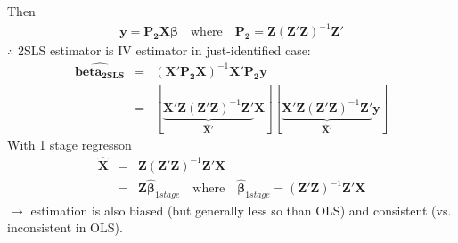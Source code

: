 Then
\begin{eqnarray*}
\boldsymbol{y}=\boldsymbol{P_{2}X\beta}\quad\text{where}\quad\boldsymbol{P_{2}}=\boldsymbol{Z}(\boldsymbol{Z'Z})^{-1}\boldsymbol{Z'}
\end{eqnarray*}
$\therefore$ 2SLS estimator is IV estimator in just-identified case:
\begin{eqnarray*}
\boldsymbol{\hat{beta_{2SLS}}} &=& (\boldsymbol{X'P_{2}X})^{-1}\boldsymbol{X'P_{2}y}\\
&=& [\underbrace{\boldsymbol{X'Z}(\boldsymbol{Z'Z})^{-1}\boldsymbol{Z'}}_{\boldsymbol{\hat{X}'}}\boldsymbol{X}][\underbrace{\boldsymbol{X'Z}(\boldsymbol{Z'Z})^{-1}\boldsymbol{Z'}}_{\boldsymbol{\hat{X}'}}\boldsymbol{y}]
\end{eqnarray*}
With 1 stage regresson
\begin{eqnarray*}
\boldsymbol{\hat{X}} &=& \boldsymbol{Z}(\boldsymbol{Z'Z})^{-1}\boldsymbol{Z'X}\\
&=& \boldsymbol{Z\hat{\beta}}_{1stage}\quad\text{where}\quad\boldsymbol{\hat{\beta}}_{1stage}=(\boldsymbol{Z'Z})^{-1}\boldsymbol{Z'X}
\end{eqnarray*}
$\to$ estimation is also biased (but generally less so than OLS) and consistent (vs. inconsistent in OLS).

